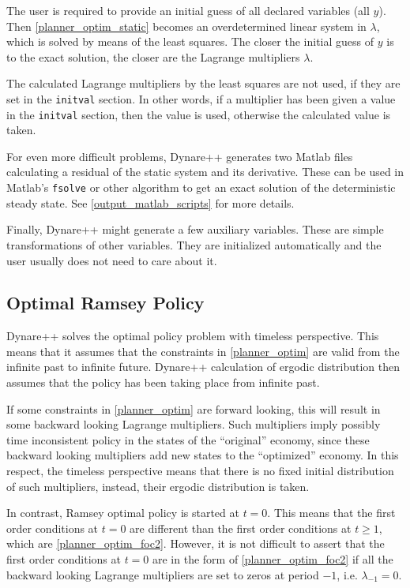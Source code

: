 \documentclass[10pt]{article}
\begin{document}
The user is required to provide an initial guess of all declared
variables (all $y$). Then \eqref{planner_optim_static} becomes an
overdetermined linear system in $\lambda$, which is solved by means of
the least squares. The closer the initial guess of $y$ is to the exact
solution, the closer are the Lagrange multipliers $\lambda$.

The calculated Lagrange multipliers by the least squares are not used,
if they are set in the {\tt initval} section. In other words, if a
multiplier has been given a value in the {\tt initval} section, then
the value is used, otherwise the calculated value is taken.

For even more difficult problems, Dynare++ generates two Matlab files
calculating a residual of the static system and its derivative. These
can be used in Matlab's {\tt fsolve} or other algorithm to get an
exact solution of the deterministic steady state. See
\ref{output_matlab_scripts} for more details.

Finally, Dynare++ might generate a few auxiliary variables. These are
simple transformations of other variables. They are initialized
automatically and the user usually does not need to care about it.

\subsection{Optimal Ramsey Policy}
\label{ramsey}

Dynare++ solves the optimal policy problem with timeless
perspective. This means that it assumes that the constraints in
\eqref{planner_optim} are valid from the infinite past to infinite
future. Dynare++ calculation of ergodic distribution then assumes that
the policy has been taking place from infinite past.

If some constraints in \eqref{planner_optim} are forward looking, this
will result in some backward looking Lagrange multipliers. Such
multipliers imply possibly time inconsistent policy in the states of
the ``original'' economy, since these backward looking multipliers add
new states to the ``optimized'' economy. In this respect, the timeless
perspective means that there is no fixed initial distribution of such
multipliers, instead, their ergodic distribution is taken.

In contrast, Ramsey optimal policy is started at $t=0$. This means
that the first order conditions at $t=0$ are different than the first
order conditions at $t\geq 1$, which are
\eqref{planner_optim_foc2}. However, it is not difficult to assert
that the first order conditions at $t=0$ are in the form of
\eqref{planner_optim_foc2} if all the backward looking Lagrange
multipliers are set to zeros at period $-1$, i.e. $\lambda_{-1}=0$.
\end{document}
